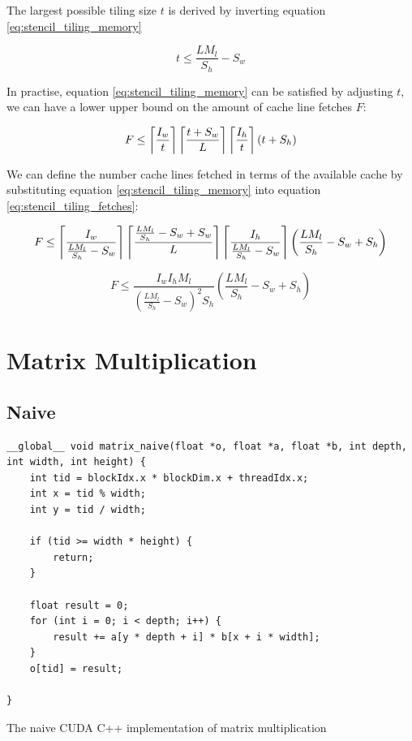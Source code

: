 The largest possible tiling size $t$ is derived by inverting equation \ref{eq:stencil_tiling_memory}

\begin{equation}
    t \leq \frac{L M_l}{S_h} - S_w
\end{equation}

In practise, equation \ref{eq:stencil_tiling_memory} can be satisfied by adjusting $t$, we can have a lower upper bound on the amount of cache line fetches $F$:

\begin{equation}
    F \leq \left\lceil \frac{I_w}{t} \right\rceil \left\lceil \frac{t + S_w}{L} \right\rceil \left\lceil \frac{I_h}{t} \right\rceil (t + S_h)
    \label{eq:stencil_tiling_fetches}
\end{equation}

We can define the number cache lines fetched in terms of the available cache by substituting equation \ref{eq:stencil_tiling_memory} into equation \ref{eq:stencil_tiling_fetches}:

\begin{equation}
    F \leq \left\lceil \frac{I_w}{\frac{L M_l}{S_h} - S_w} \right\rceil \left\lceil \frac{\frac{L M_l}{S_h} - S_w + S_w}{L} \right\rceil \left\lceil \frac{I_h}{\frac{L M_l}{S_h} - S_w} \right\rceil \left(\frac{L M_l}{S_h} - S_w + S_h\right)
\end{equation}

\begin{equation}
    F \leq \frac{I_w I_h M_l}{(\frac{L M_l}{S_h} - S_w)^2 S_h} (\frac{L M_l}{S_h} - S_w + S_h)
\end{equation}



\section{Matrix Multiplication}

\subsection{Naive}
\begin{listing}[H]
    \begin{verbatim}
__global__ void matrix_naive(float *o, float *a, float *b, int depth, int width, int height) {
    int tid = blockIdx.x * blockDim.x + threadIdx.x;
    int x = tid % width;
    int y = tid / width;
    
    if (tid >= width * height) {
        return;
    }

    float result = 0;
    for (int i = 0; i < depth; i++) {
        result += a[y * depth + i] * b[x + i * width];
    }
    o[tid] = result;
    
}
    \end{verbatim}
    \caption{
        The naive CUDA C++ implementation of matrix multiplication
    }
    \label{lst:mm_naive_cuda}
\end{listing}

